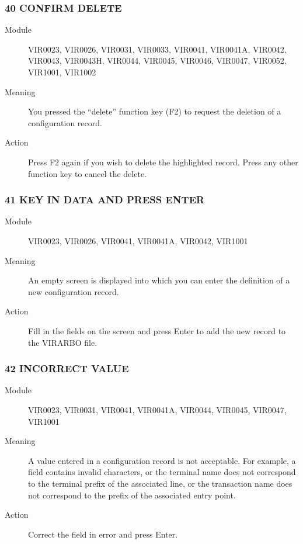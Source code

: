 \documentclass[letterpaper,10pt,english]{sphinxmanual}
\begin{document}
\subsubsection{40 CONFIRM DELETE}
\label{\detokenize{messages:confirm-delete}}\begin{description}
\item[{Module}] \leavevmode
VIR0023, VIR0026, VIR0031, VIR0033, VIR0041, VIR0041A, VIR0042, VIR0043, VIR0043H, VIR0044, VIR0045, VIR0046, VIR0047, VIR0052, VIR1001, VIR1002

\item[{Meaning}] \leavevmode
You pressed the “delete” function key (F2) to request the deletion of a configuration record.

\item[{Action}] \leavevmode
Press F2 again if you wish to delete the highlighted record. Press any other function key to cancel the delete.

\end{description}


\subsubsection{41 KEY IN DATA AND PRESS ENTER}
\label{\detokenize{messages:key-in-data-and-press-enter}}\begin{description}
\item[{Module}] \leavevmode
VIR0023, VIR0026, VIR0041, VIR0041A, VIR0042, VIR1001

\item[{Meaning}] \leavevmode
An empty screen is displayed into which you can enter the definition of a new configuration record.

\item[{Action}] \leavevmode
Fill in the fields on the screen and press Enter to add the new record to the VIRARBO file.

\end{description}


\subsubsection{42 INCORRECT VALUE}
\label{\detokenize{messages:incorrect-value}}\begin{description}
\item[{Module}] \leavevmode
VIR0023, VIR0031, VIR0041, VIR0041A, VIR0044, VIR0045, VIR0047, VIR1001

\item[{Meaning}] \leavevmode
A value entered in a configuration record is not acceptable. For example, a field contains invalid characters, or the terminal name does not correspond to the terminal prefix of the associated line, or the transaction name does not correspond to the prefix of the associated entry point.

\item[{Action}] \leavevmode
Correct the field in error and press Enter.

\end{description}
\end{document}
